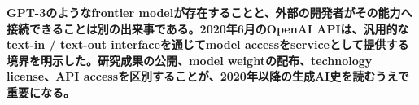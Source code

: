 \noindent\textbf{GPT-3のようなfrontier modelが存在することと、外部の開発者がその能力へ接続できることは別の出来事である。2020年6月のOpenAI APIは、汎用的なtext-in / text-out interfaceを通じてmodel accessをserviceとして提供する境界を明示した。研究成果の公開、model weightの配布、technology license、API accessを区別することが、2020年以降の生成AI史を読むうえで重要になる。}\autocite{src-3b6a4c260e20}
